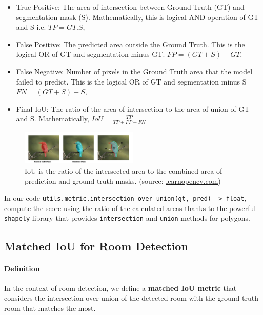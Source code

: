 \documentclass[11pt]{article}
\begin{document}
\begin{itemize}
    \item True Positive: The area of intersection between Ground Truth (GT) and segmentation mask (S). Mathematically, this is logical AND operation of GT and S i.e.
    $TP = GT.S$,
    \item False Positive: The predicted area outside the Ground Truth. This is the logical OR of GT and segmentation minus GT.
    $FP=(GT+S) - GT$,
    \item False Negative: Number of pixels in the Ground Truth area that the model failed to predict. This is the logical OR of GT and segmentation minus S
    $FN=(GT+S) -S$,
    \item Final IoU: The ratio of the area of intersection to the area of union of GT and S. Mathematically,
    $IoU = \frac{TP}{TP+FP+FN}$
\end{itemize}

\begin{figure}[hb!]
    \centering
    \includegraphics[width=0.5\textwidth]{figures/5-segmentation-iou.jpg}
    \caption{IoU is the ratio of the intersected area to the combined area of
     prediction and ground truth masks. 
     (source: \href{https://learnopencv.com/intersection-over-union-iou-in-object-detection-and-segmentation/}
        {learnopencv.com})}
    \label{fig:iou_segmentation}
\end{figure}

In our code \texttt{utils.metric.intersection\_over\_union(gt, pred) -> float},
compute the score using the ratio of the calculated areas thanks to the powerful
\texttt{shapely} library that provides \texttt{intersection} and \texttt{union} 
methods for polygons.

\subsection{Matched IoU for Room Detection}
\paragraph{Definition} In the context of room detection, we define a \textbf{matched IoU
metric} that considers the intersection over union of the detected room with the
ground truth room that matches the most. 
\end{document}
